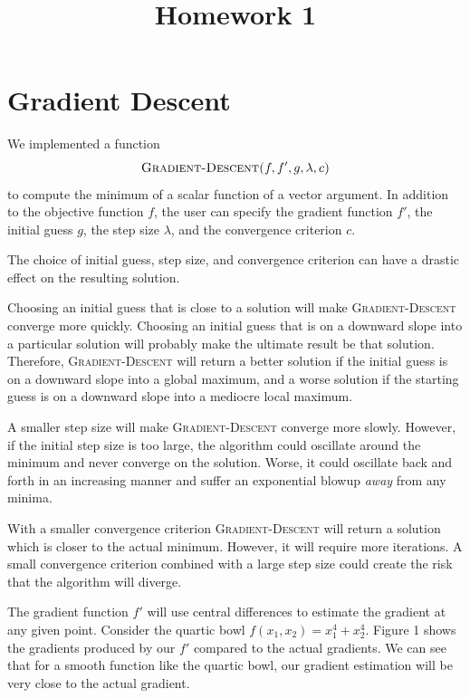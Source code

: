\documentclass{sigchi}
\begin{document}
\title{Homework 1}


\maketitle

\large

\section{Gradient Descent}

We implemented a function
\[\textsc{Gradient-Descent($f, f', g, \lambda, c$)}\]
to compute the minimum of a scalar function of a vector argument. In addition to the objective function $f$, the user can specify the gradient function $f'$, the initial guess $g$, the step size $\lambda$, and the convergence criterion $c$.

The choice of initial guess, step size, and convergence criterion can have a drastic effect on the resulting solution.

Choosing an initial guess that is close to a solution will make \textsc{Gradient-Descent} converge more quickly. Choosing an initial guess that is on a downward slope into a particular solution will probably make the ultimate result be that solution. Therefore, \textsc{Gradient-Descent} will return a better solution if the initial guess is on a downward slope into a global maximum, and a worse solution if the starting guess is on a downward slope into a mediocre local maximum.

A smaller step size will make \textsc{Gradient-Descent} converge more slowly. However, if the initial step size is too large, the algorithm could oscillate around the minimum and never converge on the solution. Worse, it could oscillate back and forth in an increasing manner and suffer an exponential blowup \emph{away} from any minima.

With a smaller convergence criterion \textsc{Gradient-Descent} will return a solution which is closer to the actual minimum. However, it will require more iterations. A small convergence criterion combined with a large step size could create the risk that the algorithm will diverge.

The gradient function $f'$ will use central differences to estimate the gradient at any given point. Consider the quartic bowl $f(x_1, x_2) = x_1^4 + x_2^4$. Figure 1 shows the gradients produced by our $f'$ compared to the actual gradients. We can see that for a smooth function like the quartic bowl, our gradient estimation will be very close to the actual gradient.
\end{document}
